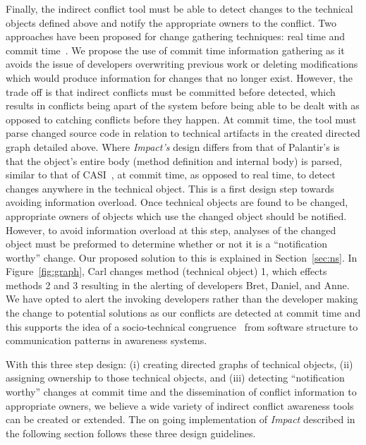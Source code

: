 \documentclass[conference]{IEEEtran}
\begin{document}
Finally, the indirect conflict tool must be able to detect changes
to the technical objects defined above and notify the appropriate owners
to the conflict. 
Two approaches have been 
proposed for change gathering techniques: real time and commit 
time~\cite{Fitzpatrick:2002:SPA}.
We propose the use of commit time
information gathering as it avoids the issue of developers 
overwriting previous work or deleting modifications which would 
produce information for changes that no longer exist. However, the
trade off is that indirect conflicts must be committed before detected,
which results in conflicts being apart of the system before being able
to be dealt with as opposed to catching conflicts before they happen.
At commit time, the tool must parse changed source code in relation
to technical artifacts in the created directed graph detailed above.
Where \textit{Impact's} design differs from that of Palantir's is that
the object's entire body (method definition and internal body) is 
parsed, similar to that of CASI~\cite{Servant:2010:CPI},
at commit time, as opposed to real time, to detect changes anywhere in the technical object.
This is a first design step towards avoiding information overload.
Once technical objects are found to be changed, appropriate owners
of objects which use the changed object should be notified. However, to
avoid information overload at this step, analyses of the changed object
must be preformed to determine whether or not it is a ``notification worthy''
change. Our proposed solution to this is explained in Section~\ref{sec:ns}.
In Figure~\ref{fig:graph}, Carl changes method (technical object) 1,
which effects methods 2 and 3 resulting in the alerting of
developers Bret, Daniel, and Anne. We have opted to alert the invoking
developers rather than the developer making the change to potential
solutions as our conflicts are detected at commit time and this supports
the idea of a socio-technical congruence~\cite{Kwan:2011:ESC} 
from software structure to communication patterns in awareness systems.

With this three step design: (i) creating directed graphs of technical
objects, (ii) assigning ownership to those technical objects, and (iii)
detecting ``notification worthy'' changes at commit time and the dissemination of conflict information
to appropriate owners, we believe a wide variety of
indirect conflict awareness tools can be created or extended. The
on going implementation of \textit{Impact} described in the following 
section follows these three design guidelines.
\end{document}
